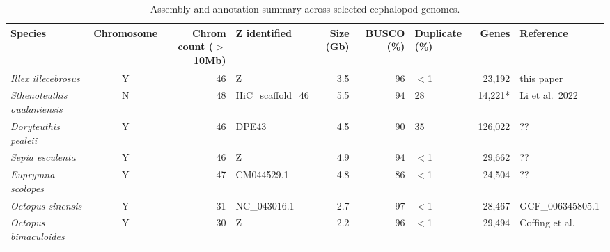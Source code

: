 \begin{table}[htbp]
\centering
\small
\begin{tabular}{l c r l r r l r l}
\hline
\textbf{Species} & \textbf{Chromosome} & \textbf{Chrom count ($>$10Mb)} & \textbf{Z identified} & \textbf{Size (Gb)} & \textbf{BUSCO (\%)} & \textbf{Duplicate (\%)} & \textbf{Genes} & \textbf{Reference} \\
\hline
\textit{Illex illecebrosus} & Y & 46 & Z & 3.5 & 96 & $<$1 & 23{,}192 & this paper \\
\textit{Sthenoteuthis oualaniensis} & N & 48 & HiC\_scaffold\_46 & 5.5 & 94 & 28 & 14{,}221* & Li et al.\ 2022 \\
\textit{Doryteuthis pealeii} & Y & 46 & DPE43 & 4.5 & 90 & 35 & 126{,}022 & ?? \\
\textit{Sepia esculenta} & Y & 46 & Z & 4.9 & 94 & $<$1 & 29{,}662 & ?? \\
\textit{Euprymna scolopes} & Y & 47 & CM044529.1 & 4.8 & 86 & $<$1 & 24{,}504 & ?? \\
\textit{Octopus sinensis} & Y & 31 & NC\_043016.1 & 2.7 & 97 & $<$1 & 28{,}467 & GCF\_006345805.1 \\
\textit{Octopus bimaculoides} & Y & 30 & Z & 2.2 & 96 & $<$1 & 29{,}494 & Coffing et al. \\
\hline
\end{tabular}
\caption{Assembly and annotation summary across selected cephalopod genomes.}
\end{table}
